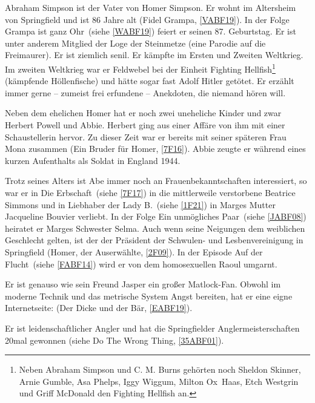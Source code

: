 Abraham Simpson ist der Vater von Homer Simpson. Er wohnt im Altersheim von Springfield und ist 86 Jahre alt (\glqq Fidel Grampa\grqq, \ref{VABF19}). In der Folge \glqq Grampa ist ganz Ohr\grqq\ (siehe \ref{WABF19}) feiert er seinen 87. Geburtstag. Er ist unter anderem Mitglied der Loge der Steinmetze (eine Parodie auf die Freimaurer). Er ist ziemlich senil. Er kämpfte im Ersten und Zweiten Weltkrieg. Im zweiten Weltkrieg war er Feldwebel bei der Einheit Fighting Hellfish\footnote{Neben Abraham Simpson und C. M. Burns gehörten noch Sheldon Skinner, Arnie Gumble, Asa Phelps, Iggy Wiggum, Milton \glqq Ox\grqq\ Haas, Etch Westgrin und Griff McDonald den Fighting Hellfish an.} (kämpfende Höllenfische) und hätte sogar fast Adolf Hitler getötet. Er erzählt immer gerne -- zumeist frei erfundene -- Anekdoten, die niemand hören will. 

Neben dem ehelichen Homer hat er noch zwei uneheliche Kinder und zwar Herbert Powell und Abbie. Herbert ging aus einer Affäre von ihm mit einer Schaustellerin hervor. Zu dieser Zeit war er bereits mit seiner späteren Frau Mona zusammen (\glqq Ein Bruder für Homer\grqq , \ref{7F16}). Abbie zeugte er während eines kurzen Aufenthalts als Soldat in England 1944.

Trotz seines Alters ist Abe immer noch an Frauenbekanntschaften interessiert, so war er in \glqq Die Erbschaft\grqq\ (siehe \ref{7F17}) in die mittlerweile verstorbene Beatrice Simmons und in \glqq Liebhaber der Lady B.\grqq\ (siehe \ref{1F21}) in Marges Mutter Jacqueline Bouvier verliebt. In der Folge \glqq Ein unmögliches Paar\grqq\ (siehe \ref{JABF08}) heiratet er Marges Schwester Selma. Auch wenn seine Neigungen dem weiblichen Geschlecht gelten, ist der der Präsident der Schwulen- und Lesbenvereinigung in Springfield (\glqq Homer, der Auserwählte\grqq , \ref{2F09}). In der Episode \glqq Auf der Flucht\grqq\ (siehe \ref{FABF14}) wird er von dem homosexuellen Raoul umgarnt.

Er ist genauso wie sein Freund Jasper ein großer Matlock-Fan. Obwohl im moderne Technik und das metrische System Angst bereiten, hat er eine eigne Internetseite: (\glqq Der Dicke und der Bär\grqq, \ref{EABF19}).

Er ist leidenschaftlicher Angler und hat die Springfielder Anglermeisterschaften 20mal gewonnen (siehe \glqq Do The Wrong Thing\grqq, \ref{35ABF01}).

